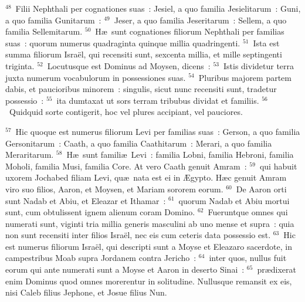${}^{48}$~Filii Nephthali per cognationes suas~: Jesiel, a quo familia Jesielitarum~: Guni, a quo familia Gunitarum~:
${}^{49}$~Jeser, a quo familia Jeseritarum~: Sellem, a quo familia Sellemitarum.
${}^{50}$~H\ae\ sunt cognationes filiorum Nephthali per familias suas~: quorum numerus quadraginta quinque millia quadringenti.
${}^{51}$~Ista est summa filiorum Isra\"el, qui recensiti sunt, sexcenta millia, et mille septingenti triginta.
${}^{52}$~Locutusque est Dominus ad Moysen, dicens~:
${}^{53}$~Istis dividetur terra juxta numerum vocabulorum in possessiones suas.
${}^{54}$~Pluribus majorem partem dabis, et paucioribus minorem~: singulis, sicut nunc recensiti sunt, tradetur possessio~:
${}^{55}$~ita dumtaxat ut sors terram tribubus dividat et familiis.
${}^{56}$~Quidquid sorte contigerit, hoc vel plures accipiant, vel pauciores.


${}^{57}$~Hic quoque est numerus filiorum Levi per familias suas~: Gerson, a quo familia Gersonitarum~: Caath, a quo familia Caathitarum~: Merari, a quo familia Meraritarum.
${}^{58}$~H\ae\ sunt famili\ae\ Levi~: familia Lobni, familia Hebroni, familia Moholi, familia Musi, familia Core. At vero Caath genuit Amram~:
${}^{59}$~qui habuit uxorem Jochabed filiam Levi, qu\ae\ nata est ei in \AE gypto. H\ae c genuit Amram viro suo filios, Aaron, et Moysen, et Mariam sororem eorum.
${}^{60}$~De Aaron orti sunt Nadab et Abiu, et Eleazar et Ithamar~:
${}^{61}$~quorum Nadab et Abiu mortui sunt, cum obtulissent ignem alienum coram Domino.
${}^{62}$~Fueruntque omnes qui numerati sunt, viginti tria millia generis masculini ab uno mense et supra~: quia non sunt recensiti inter filios Isra\"el, nec eis cum ceteris data possessio est.
${}^{63}$~Hic est numerus filiorum Isra\"el, qui descripti sunt a Moyse et Eleazaro sacerdote, in campestribus Moab supra Jordanem contra Jericho~:
${}^{64}$~inter quos, nullus fuit eorum qui ante numerati sunt a Moyse et Aaron in deserto Sinai~:
${}^{65}$~pr\ae dixerat enim Dominus quod omnes morerentur in solitudine. Nullusque remansit ex eis, nisi Caleb filius Jephone, et Josue filius Nun.

